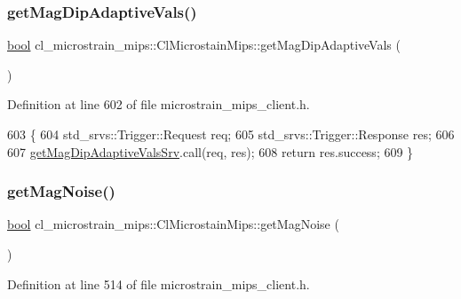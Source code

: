 \subsubsection{\texorpdfstring{get\+Mag\+Dip\+Adaptive\+Vals()}{getMagDipAdaptiveVals()}}
{\footnotesize\ttfamily \hyperlink{classbool}{bool} cl\+\_\+microstrain\+\_\+mips\+::\+Cl\+Microstain\+Mips\+::get\+Mag\+Dip\+Adaptive\+Vals (\begin{DoxyParamCaption}{ }\end{DoxyParamCaption})\hspace{0.3cm}{\ttfamily [inline]}}



Definition at line 602 of file microstrain\+\_\+mips\+\_\+client.\+h.


\begin{DoxyCode}
603     \{
604         std\_srvs::Trigger::Request req;
605         std\_srvs::Trigger::Response res;
606 
607         \hyperlink{classcl__microstrain__mips_1_1ClMicrostainMips_aa5a412d1343febccf6bda432eacb0581}{getMagDipAdaptiveValsSrv}.call(req, res);
608         \textcolor{keywordflow}{return} res.success;
609     \}
\end{DoxyCode}
\mbox{\label{classcl__microstrain__mips_1_1ClMicrostainMips_aaa3a569e4b555b0db5b3f3d02ae1b33e}} 
\subsubsection{\texorpdfstring{get\+Mag\+Noise()}{getMagNoise()}}
{\footnotesize\ttfamily \hyperlink{classbool}{bool} cl\+\_\+microstrain\+\_\+mips\+::\+Cl\+Microstain\+Mips\+::get\+Mag\+Noise (\begin{DoxyParamCaption}{ }\end{DoxyParamCaption})\hspace{0.3cm}{\ttfamily [inline]}}



Definition at line 514 of file microstrain\+\_\+mips\+\_\+client.\+h.


